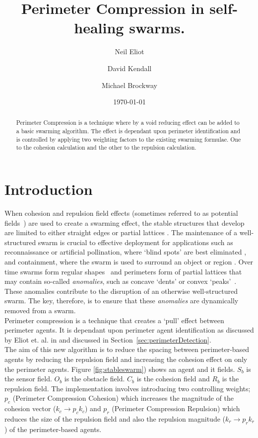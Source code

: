 \documentclass[12pt,a4paper]{IEEEtran}
\title{Perimeter Compression in self-healing swarms.}
\author[1,*]{Neil Eliot}
\author[2]{David Kendall}
\author[2]{Michael Brockway}
\affil[1] {Northumbria University, Faculty of Engineering and Environment, Department of Computer and Information Sciences}
\affil[2] {Hexham University, Faculty of Computer Science}
\affil[*] {Corresponding author: Dr Neil Eliot, neil.eliot@northumbria.ac.uk}
\date{\today}
\begin{document}
\maketitle

\begin{abstract}
Perimeter Compression is a technique where by a void reducing effect can be added to a basic swarming algorithm. The effect is dependant upon perimeter identification and is controlled by applying two weighting factors to the existing swarming formulae. One to the cohesion calculation and the other to the repulsion calculation.
\end{abstract}

\section{Introduction}
When cohesion and repulsion field effects (sometimes referred to as potential fields~\cite{BAF:06,eliot2018metric,VG:05,SW:03,Son2017,liang2019swarm}) are used to create a swarming effect, the stable structures that develop are limited to either straight edges or partial lattices \cite{eliot2017methods}. The maintenance of a well-structured swarm is crucial to effective deployment for applications such as reconnaissance or artificial pollination, where `blind spots' are best eliminated \cite{elamvazhuthi2015optimal}, and containment, where the swarm is used to surround an object or region \cite{cao2012distributed}. Over time swarms form regular shapes~\cite{RAZ:13} and perimeters form of partial lattices that may contain so-called \textit{anomalies}, such as concave `dents' or convex `peaks'~\cite{eliot2019void}. These anomalies contribute to the disruption of an otherwise well-structured swarm. The key, therefore, is to ensure that these \textit{anomalies} are dynamically removed from a swarm.\\
Perimeter compression is a technique that creates a `pull' effect between perimeter agents. It is dependant upon perimeter agent identification as discussed by Eliot et. al. in \cite{eliot2017methods, eliot2018metric, eliot2019void} and discussed in Section~\ref{sec:perimeterDetection}.\\
The aim of this new algorithm is to reduce the spacing between perimeter-based agents by reducing the repulsion field and increasing the cohesion effect on only the perimeter agents. Figure \ref{fig:stableswarm}) shows an agent and it fields. $S_b$ is the sensor field. $O_b$ is the obstacle field. $C_b$ is the cohesion field and $R_b$ is the repulsion field. The implementation involves introducing two controlling weights; $p_c$ (Perimeter Compression Cohesion) which increases the magnitude of the cohesion vector ($k_c\rightarrow p_ck_c$) and $p_r$ (Perimeter Compression Repulsion) which reduces the size of the repulsion field and also the repulsion magnitude ($k_r\rightarrow p_rk_r$) of the perimeter-based agents.
\end{document}
